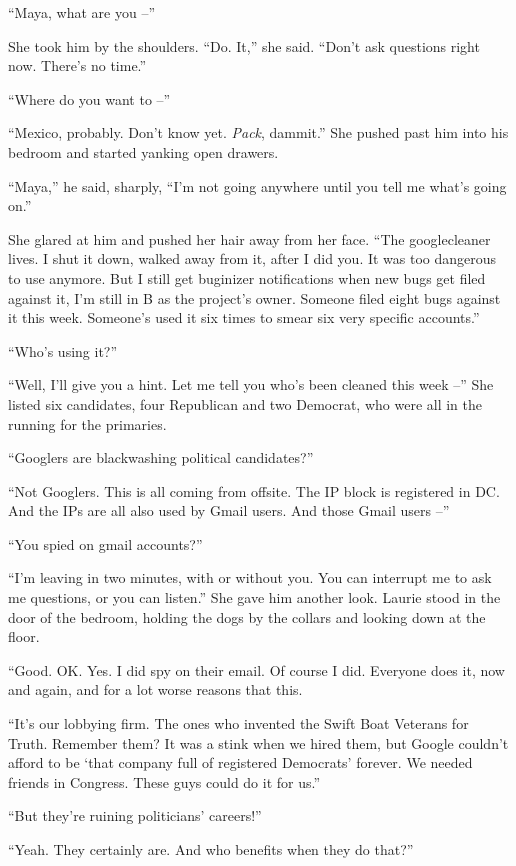 “Maya, what are you --”

She took him by the shoulders. “Do. It,” she said. “Don't ask 
questions right now. There's no time.”

“Where do you want to --”

“Mexico, probably. Don't know yet. \emph{Pack}, dammit.” She pushed 
past him into his bedroom and started yanking open drawers.

“Maya,” he said, sharply, “I'm not going anywhere until you tell 
me what's going on.”

She glared at him and pushed her hair away from her face. “The 
googlecleaner lives. I shut it down, walked away from it, after I did 
you. It was too dangerous to use anymore. But I still get buginizer 
notifications when new bugs get filed against it, I'm still in B as the 
project's owner. Someone filed eight bugs against it this week. 
Someone's used it six times to smear six very specific accounts.”

“Who's using it?”

“Well, I'll give you a hint. Let me tell you who's been cleaned this 
week --” She listed six candidates, four Republican and two Democrat, 
who were all in the running for the primaries.

“Googlers are blackwashing political candidates?”

“Not Googlers. This is all coming from offsite. The IP block is 
registered in DC. And the IPs are all also used by Gmail users. And 
those Gmail users --”

“You spied on gmail accounts?”

“I'm leaving in two minutes, with or without you. You can interrupt 
me to ask me questions, or you can listen.” She gave him another 
look. Laurie stood in the door of the bedroom, holding the dogs by the 
collars and looking down at the floor.

“Good. OK. Yes. I did spy on their email. Of course I did. Everyone 
does it, now and again, and for a lot worse reasons that this.

“It's our lobbying firm. The ones who invented the Swift Boat 
Veterans for Truth. Remember them? It was a stink when we hired them, 
but Google couldn't afford to be `that company full of registered 
Democrats' forever. We needed friends in Congress. These guys could do 
it for us.”

“But they're ruining politicians' careers!”

“Yeah. They certainly are. And who benefits when they do that?”

